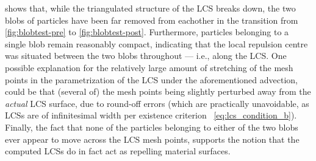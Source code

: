 

 shows that, while the triangulated structure of the LCS
breaks down, the two blobs of particles have been far removed from eachother
in the transition from \cref{fig:blobtest-pre} to \cref{fig:blobtest-post}.
Furthermore, particles belonging to a single blob remain reasonably compact,
indicating that the local repulsion centre was situated between the two
blobs throughout --- i.e., along the LCS. One possible explanation
for the relatively large amount of stretching of the mesh points in the
parametrization of the LCS under the aforementioned advection, could be
that (several of) the mesh points being slightly perturbed away from
the \emph{actual} LCS surface, due to round-off errors (which are practically
unavoidable, as LCSs are of infinitesimal width per existence criterion%
~\eqref{eq:lcs_condition_b}). Finally, the fact that none of the particles
belonging to either of the two blobs ever appear to move across the
LCS mesh points, supports the notion that the computed LCSs do in fact act as
repelling material surfaces.
